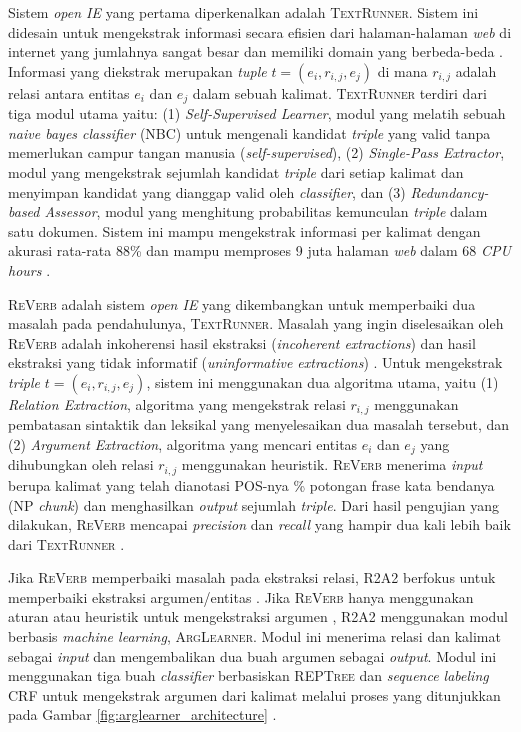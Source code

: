 Sistem \textit{open IE} yang pertama diperkenalkan adalah \textsc{TextRunner}. Sistem ini didesain untuk mengekstrak informasi secara efisien dari halaman-halaman \textit{web} di internet yang jumlahnya sangat besar dan memiliki domain yang berbeda-beda \citep{banko2007open}. Informasi yang diekstrak merupakan \textit{tuple} $t = (e_i, r_{i,j}, e_j)$ di mana $r_{i,j}$ adalah relasi antara entitas $e_i$ dan $e_j$ dalam sebuah kalimat. \textsc{TextRunner} terdiri dari tiga modul utama \citep{banko2007open} yaitu: (1) \textit{Self-Supervised Learner}, modul yang melatih sebuah \textit{naive bayes classifier} (NBC) untuk mengenali kandidat \textit{triple} yang valid tanpa memerlukan campur tangan manusia (\textit{self-supervised}), (2) \textit{Single-Pass Extractor}, modul yang mengekstrak sejumlah kandidat \textit{triple} dari setiap kalimat dan menyimpan kandidat yang dianggap valid oleh \textit{classifier}, dan (3) \textit{Redundancy-based Assessor}, modul yang menghitung probabilitas kemunculan \textit{triple} dalam satu dokumen. Sistem ini mampu mengekstrak informasi per kalimat dengan akurasi rata-rata 88\% dan mampu memproses 9 juta halaman \textit{web} dalam 68 \textit{CPU hours} \citep{banko2007open}.

\textsc{ReVerb} adalah sistem \textit{open IE} yang dikembangkan untuk memperbaiki dua masalah pada pendahulunya, \textsc{TextRunner}. Masalah yang ingin diselesaikan oleh \textsc{ReVerb} adalah inkoherensi hasil ekstraksi (\textit{incoherent extractions}) dan hasil ekstraksi yang tidak informatif (\textit{uninformative extractions}) \citep{fader2011identifying}. Untuk mengekstrak \textit{triple} $t = (e_i, r_{i,j}, e_j)$, sistem ini menggunakan dua algoritma utama, yaitu (1) \textit{Relation Extraction}, algoritma yang mengekstrak relasi $r_{i,j}$ menggunakan pembatasan sintaktik dan leksikal yang menyelesaikan dua masalah tersebut, dan (2) \textit{Argument Extraction}, algoritma yang mencari entitas $e_i$ dan $e_j$ yang dihubungkan oleh relasi $r_{i,j}$ menggunakan heuristik.  \textsc{ReVerb} menerima \textit{input} berupa kalimat yang telah dianotasi POS-nya \% potongan frase kata bendanya (NP \textit{chunk}) dan menghasilkan \textit{output} sejumlah \textit{triple}. Dari hasil pengujian yang dilakukan, \textsc{ReVerb} mencapai \textit{precision} dan \textit{recall} yang hampir dua kali lebih baik dari \textsc{TextRunner} \citep{fader2011identifying}.

Jika \textsc{ReVerb} memperbaiki masalah pada ekstraksi relasi, \textsc{R2A2} berfokus untuk memperbaiki ekstraksi argumen/entitas \citep{etzioni2011open}. Jika \textsc{ReVerb} hanya menggunakan aturan atau heuristik untuk mengekstraksi argumen \citep{fader2011identifying}, \textsc{R2A2} menggunakan modul berbasis \textit{machine learning}, \textsc{ArgLearner}. Modul ini menerima relasi dan kalimat sebagai \textit{input} dan mengembalikan dua buah argumen sebagai \textit{output}. Modul ini menggunakan tiga buah \textit{classifier} berbasiskan \textsc{REPTree} \citep{hall2009weka} dan \textit{sequence labeling} CRF \citep{mccallum2002mallet} untuk mengekstrak argumen dari kalimat melalui proses yang ditunjukkan pada Gambar \ref{fig:arglearner_architecture} \citep{etzioni2011open}.

